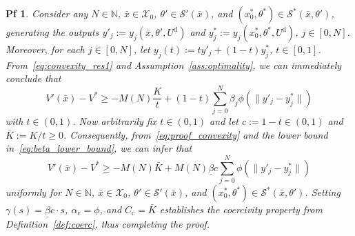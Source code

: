 \documentclass[10pt,a4paper]{amsart}
\newtheorem{pf}{Pf}
\begin{document}
\begin{pf}
	Consider any $N\in\mathbb{N}$, $\bar{x}\in\mathcal{X}_0$, $\theta'\in\mathcal{S}'(\bar{x})$, and $(x_0^*,{\theta}^*)\in\mathcal{S}^*(\bar{x},\theta')$, generating the outputs $y'_j:=y_j(\bar{x},{\theta}',U^\mathrm{d})$ and ${y}_j^*:=y_j({x}^*_0,{\theta}^*,U^\mathrm{d})$, $j\in[0,N]$. Moreover, for each $j\in[0,N]$, let ${y}_j(t) := ty'_j + (1-t)y^*_j$, $t\in[0,1]$. From~\eqref{eq:convexity_res1} and Assumption~\ref{ass:optimality}, we can immediately conclude that
	\begin{equation}
		V'(\bar{x}) - V^* \geq -M(N)\frac{K}{t} + (1-t)\sum_{j=0}^N\beta_j\phi(\|y'_j-{y}^*_j\|)\label{eq:proof_convexity}
	\end{equation}
	with $t\in(0,1)$.
	Now arbitrarily fix $t\in(0,1)$ and let $c:=1-t\in(0,1)$ and $\bar{K}:=K/t\geq0$. Consequently, from~\eqref{eq:proof_convexity} and the lower bound in~\eqref{eq:beta_lower_bound}, we can infer that
	\begin{equation*}
		V'(\bar{x}) - V^* \geq -M(N)\bar{K} +  M(N)\underline{\beta}c\sum_{j=0}^N\phi(\|y'_j-{y}^*_j\|)\label{eq:proof_convexity_2}
	\end{equation*}
	uniformly for $N\in\mathbb{N}$, $\bar{x}\in\mathcal{X}_0$, $\theta'\in\mathcal{S}'(\bar{x})$, and $(x_0^*,{\theta}^*)\in\mathcal{S}^*(\bar{x},\theta')$.
	Setting $\gamma(s) = \underline{\beta}c\cdot s$, $\alpha_\mathrm{c} = \phi$, and $C_\mathrm{c}= \bar{K}$ establishes the coercivity property from Definition~\ref{def:coerc}, thus completing the proof.
\end{pf}
\end{document}
